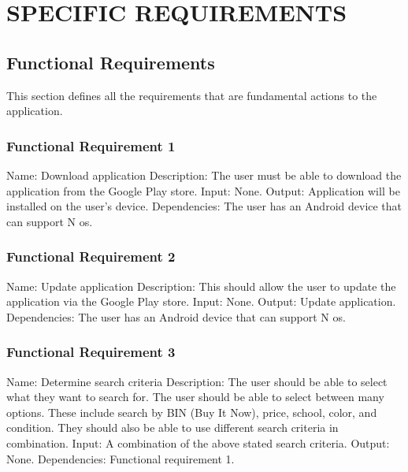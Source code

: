 \documentclass[journal,compsoc, 10pt, draftclsnofoot, onecolumn]{IEEEtran}
\begin{document}
\section{SPECIFIC REQUIREMENTS}

\subsection{Functional Requirements}

This section defines all the requirements that are fundamental actions to the 
application.

\subsubsection{Functional Requirement 1}
Name: Download application \newline
Description: The user must be able to download the application from the Google 
Play store. \newline
Input: None. \newline
Output: Application will be installed on the user's device. \newline
Dependencies: The user has an Android device that can support N os.

\subsubsection{Functional Requirement 2}
Name: Update application\newline
Description: This should allow the user to update the application via the Google
 Play store.\newline
Input: None.\newline
Output: Update application.\newline
Dependencies: The user has an Android device that can support N os.

\subsubsection{Functional Requirement 3}
Name: Determine search criteria\newline
Description: The user should be able to select what they want to search for. The
 user should be able to select between many options. These include search by BIN
 (Buy It Now), price, school, color, and condition. They should also be
 able to use different search criteria in combination.\newline
Input: A combination of the above stated search criteria.\newline
Output: None.\newline
Dependencies: Functional requirement 1.
\end{document}

